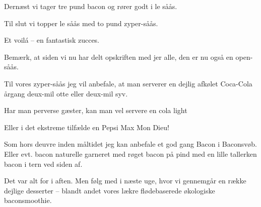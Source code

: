 \documentclass[a4paper,11pt]{article}
\begin{document}
\begin{sketch}

 Dernæst vi tager tre pund bacon og rører godt i le såås. 


 Til slut vi topper le såås med to pund zyper-såås. 


 Et voilá -- en fantastisk zucces.


 Bemærk, at siden vi nu har delt opskriften med jer alle, den er nu også en open-såås.

 Til vores zyper-såås jeg vil anbefale, at man serverer en dejlig afkølet Coca-Cola 
årgang deux-mil otte eller deux-mil syv. 


 Har man perverse gæster, kan man vel servere en cola light  


 Eller i det ekstreme tilfælde en Pepsi Max  Mon 
Dieu!


 Som hors deuvre inden måltidet jeg kan anbefale et god gang Bacon i Baconsvøb. 
Eller evt. bacon naturelle garneret med røget bacon på pind med en lille tallerken bacon i 
tern ved siden af.

 Det var alt for i aften. Men følg med i næste uge, hvor vi gennemgår en række 
dejlige desserter -- blandt andet vores lækre flødebaserede økologiske baconsmoothie.


\end{sketch}
\end{document}
